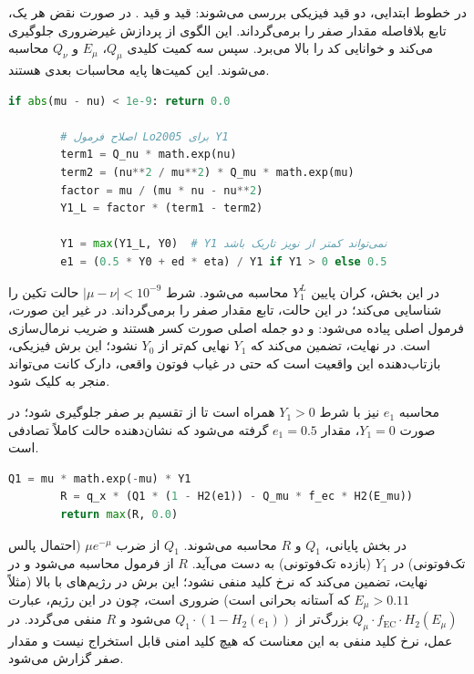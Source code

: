 در خطوط ابتدایی، دو قید فیزیکی بررسی می‌شوند: قید  و قید \lr{$\nu \geq 0.9 \mu$}. در صورت نقض هر یک، تابع بلافاصله مقدار صفر را برمی‌گرداند. این الگوی  از پردازش غیرضروری جلوگیری می‌کند و خوانایی کد را بالا می‌برد. سپس سه کمیت کلیدی $Q_\mu$، $E_\mu$ و $Q_\nu$ محاسبه می‌شوند. این کمیت‌ها پایه محاسبات بعدی هستند.

\begin{LTR}
	\begin{lstlisting}[language=Python]
		if abs(mu - nu) < 1e-9: return 0.0
		
		# اصلاح فرمول Lo2005 برای Y1
		term1 = Q_nu * math.exp(nu)
		term2 = (nu**2 / mu**2) * Q_mu * math.exp(mu)
		factor = mu / (mu * nu - nu**2)
		Y1_L = factor * (term1 - term2)
		
		Y1 = max(Y1_L, Y0)  # Y1 نمی‌تواند کمتر از نویز تاریک باشد
		e1 = (0.5 * Y0 + ed * eta) / Y1 if Y1 > 0 else 0.5
	\end{lstlisting}
\end{LTR}

در این بخش، کران پایین $Y_1^L$ محاسبه می‌شود. شرط $\left| \mu - \nu \right| < 10^{-9}$ حالت تکین را شناسایی می‌کند؛ در این حالت، تابع مقدار صفر را برمی‌گرداند. در غیر این صورت، فرمول اصلی  پیاده می‌شود:  و  دو جمله اصلی صورت کسر هستند و  ضریب نرمال‌سازی است. در نهایت،  تضمین می‌کند که $Y_1$ نهایی کم‌تر از $Y_0$ نشود؛ این برش فیزیکی، بازتاب‌دهنده این واقعیت است که حتی در غیاب فوتون واقعی، دارک کانت می‌تواند منجر به کلیک شود.

محاسبه $e_1$ نیز با شرط $Y_1 > 0$ همراه است تا از تقسیم بر صفر جلوگیری شود؛ در صورت $Y_1 = 0$، مقدار $e_1 = 0.5$ گرفته می‌شود که نشان‌دهنده حالت کاملاً تصادفی است.

\begin{LTR}
	\begin{lstlisting}[language=Python]
		Q1 = mu * math.exp(-mu) * Y1
		R = q_x * (Q1 * (1 - H2(e1)) - Q_mu * f_ec * H2(E_mu))
		return max(R, 0.0)
	\end{lstlisting}
\end{LTR}

در بخش پایانی، $Q_1$ و $R$ محاسبه می‌شوند. $Q_1$ از ضرب $\mu e^{-\mu}$ (احتمال پالس تک‌فوتونی) در $Y_1$ (بازده تک‌فوتونی) به دست می‌آید. $R$ از فرمول  محاسبه می‌شود و در نهایت،  تضمین می‌کند که نرخ کلید منفی نشود؛ این برش در رژیم‌های با  بالا (مثلاً $E_\mu > 0.11$ که آستانه بحرانی  است) ضروری است، چون در این رژیم، عبارت $Q_\mu \cdot f_{\text{EC}} \cdot H_2(E_\mu)$ بزرگ‌تر از $Q_1 \cdot (1 - H_2(e_1))$ می‌شود و $R$ منفی می‌گردد. در عمل، نرخ کلید منفی به این معناست که هیچ کلید امنی قابل استخراج نیست و مقدار صفر گزارش می‌شود.

